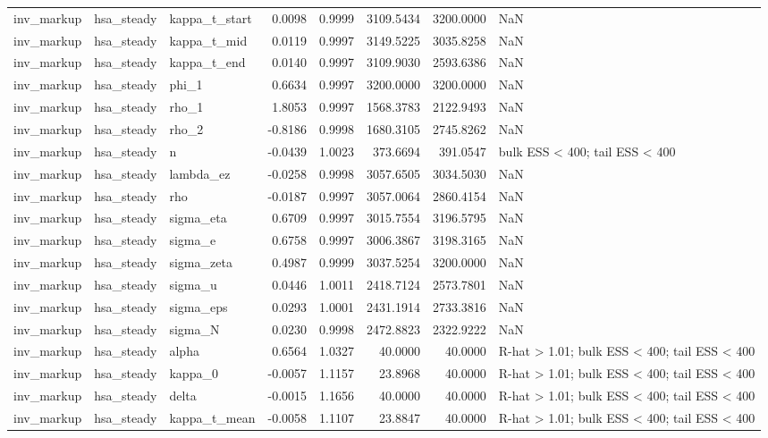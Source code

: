 \begin{tabular}{lllrrrrl}
inv\_markup & hsa\_steady & kappa\_t\_start & 0.0098 & 0.9999 & 3109.5434 & 3200.0000 & NaN \\
inv\_markup & hsa\_steady & kappa\_t\_mid & 0.0119 & 0.9997 & 3149.5225 & 3035.8258 & NaN \\
inv\_markup & hsa\_steady & kappa\_t\_end & 0.0140 & 0.9997 & 3109.9030 & 2593.6386 & NaN \\
inv\_markup & hsa\_steady & phi\_1 & 0.6634 & 0.9997 & 3200.0000 & 3200.0000 & NaN \\
inv\_markup & hsa\_steady & rho\_1 & 1.8053 & 0.9997 & 1568.3783 & 2122.9493 & NaN \\
inv\_markup & hsa\_steady & rho\_2 & -0.8186 & 0.9998 & 1680.3105 & 2745.8262 & NaN \\
inv\_markup & hsa\_steady & n & -0.0439 & 1.0023 & 373.6694 & 391.0547 & bulk ESS < 400; tail ESS < 400 \\
inv\_markup & hsa\_steady & lambda\_ez & -0.0258 & 0.9998 & 3057.6505 & 3034.5030 & NaN \\
inv\_markup & hsa\_steady & rho & -0.0187 & 0.9997 & 3057.0064 & 2860.4154 & NaN \\
inv\_markup & hsa\_steady & sigma\_eta & 0.6709 & 0.9997 & 3015.7554 & 3196.5795 & NaN \\
inv\_markup & hsa\_steady & sigma\_e & 0.6758 & 0.9997 & 3006.3867 & 3198.3165 & NaN \\
inv\_markup & hsa\_steady & sigma\_zeta & 0.4987 & 0.9999 & 3037.5254 & 3200.0000 & NaN \\
inv\_markup & hsa\_steady & sigma\_u & 0.0446 & 1.0011 & 2418.7124 & 2573.7801 & NaN \\
inv\_markup & hsa\_steady & sigma\_eps & 0.0293 & 1.0001 & 2431.1914 & 2733.3816 & NaN \\
inv\_markup & hsa\_steady & sigma\_N & 0.0230 & 0.9998 & 2472.8823 & 2322.9222 & NaN \\
inv\_markup & hsa\_steady & alpha & 0.6564 & 1.0327 & 40.0000 & 40.0000 & R-hat > 1.01; bulk ESS < 400; tail ESS < 400 \\
inv\_markup & hsa\_steady & kappa\_0 & -0.0057 & 1.1157 & 23.8968 & 40.0000 & R-hat > 1.01; bulk ESS < 400; tail ESS < 400 \\
inv\_markup & hsa\_steady & delta & -0.0015 & 1.1656 & 40.0000 & 40.0000 & R-hat > 1.01; bulk ESS < 400; tail ESS < 400 \\
inv\_markup & hsa\_steady & kappa\_t\_mean & -0.0058 & 1.1107 & 23.8847 & 40.0000 & R-hat > 1.01; bulk ESS < 400; tail ESS < 400 \\

\end{tabular}
